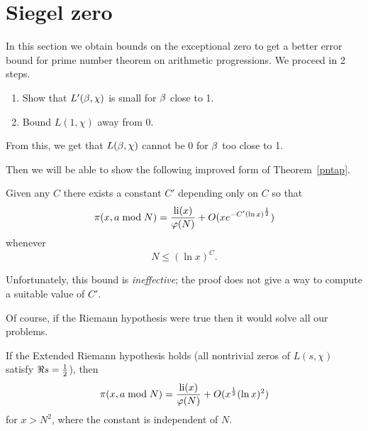 \section{Siegel zero}
In this section we obtain bounds on the exceptional zero to get a better error bound for prime number theorem on arithmetic progressions. %
We proceed in 2 steps.
\begin{enumerate}
\item Show that $L'(\beta,\chi)$ is small for $\beta$ close to 1.
\item Bound $L(1,\chi)$ away from 0.
\end{enumerate}
From this, we get that $L(\beta,\chi)$ cannot be 0 for $\beta$ too close to 1.

Then we will be able to show the following improved form of Theorem~\ref{pntap}.
\begin{thm}\label{siegel-walfisz}
Given any $C$ there exists a constant $C'$ depending only on $C$ so that
\[
\pi(x,a\bmod N)=\frac{\operatorname{li}(x)}{\varphi(N)}+O(xe^{-C'(\ln x)^{\frac{1}{2}}})
\]
whenever
\[
N\le (\ln x)^C.
\]
\end{thm}
Unfortunately, this bound is \emph{ineffective}; the proof does not give a way to compute a suitable value of $C'$.

Of course, if the Riemann hypothesis were true then it would solve all our problems.
\begin{thm}
If the Extended Riemann hypothesis holds (all nontrivial zeros of $L(s,\chi)$ satisfy $\Re s=\frac{1}{2}$), then
\[
\pi(x,a\bmod N)= \frac{\operatorname{li}(x)}{\varphi(N)} +O(x^{\frac{1}{2}}(\ln x)^2)
\]
for $x>N^2$, 
where the constant is independent of $N$.
\end{thm}
